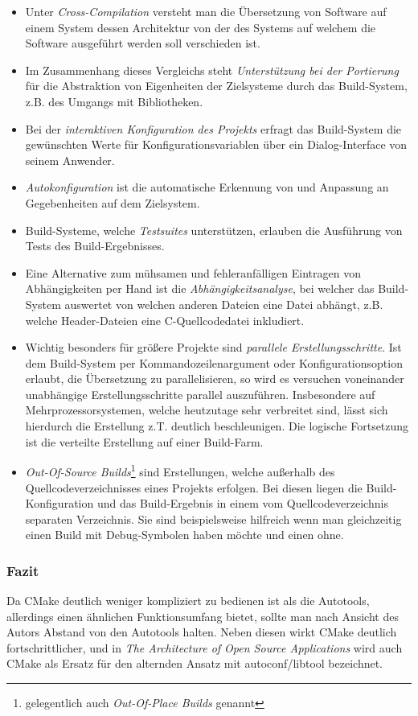 \begin{itemize}
%
\item Unter \emph{Cross-Compilation} versteht man die Übersetzung von Software
auf einem System dessen Architektur von der des Systems auf welchem die Software
ausgeführt werden soll verschieden ist.
%
\item Im Zusammenhang dieses Vergleichs steht \emph{Unterstützung bei der
Portierung} für die Abstraktion von Eigenheiten der Zielsysteme durch das
Build-System, z.B. des Umgangs mit Bibliotheken.
%
\item Bei der \emph{interaktiven Konfiguration des Projekts} erfragt das
Build-System die gewünschten Werte für Konfigurationsvariablen über ein
Dialog-Interface von seinem Anwender.
%
\item \emph{Autokonfiguration} ist die automatische Erkennung von und Anpassung
an Gegebenheiten auf dem Zielsystem.
%
\item Build-Systeme, welche \emph{Testsuites} unterstützen, erlauben die
Ausführung von Tests des Build-Ergebnisses.
%
%
\item Eine Alternative zum mühsamen und fehleranfälligen Eintragen von
Abhängigkeiten per Hand ist die \emph{Abhängigkeitsanalyse}, bei welcher das
Build-System auswertet von welchen anderen Dateien eine Datei abhängt, z.B.
welche Header-Dateien eine C-Quellcodedatei inkludiert.
%
\item Wichtig besonders für größere Projekte sind \emph{parallele
Erstellungsschritte}. Ist dem Build-System per Kommandozeilenargument oder
Konfigurationsoption erlaubt, die Übersetzung zu parallelisieren, so wird es
versuchen voneinander unabhängige Erstellungsschritte parallel auszuführen.
Insbesondere auf Mehrprozessorsystemen, welche heutzutage sehr verbreitet sind,
lässt sich hierdurch die Erstellung z.T. deutlich beschleunigen. Die logische
Fortsetzung ist die verteilte Erstellung auf einer Build-Farm.
%
\item \emph{Out-Of-Source Builds}\footnote{gelegentlich auch \emph{Out-Of-Place
Builds} genannt} sind Erstellungen, welche außerhalb des Quellcodeverzeichnisses
eines Projekts erfolgen. Bei diesen liegen die Build-Konfiguration und das
Build-Ergebnis in einem vom Quellcodeverzeichnis separaten Verzeichnis. Sie sind
beispielsweise hilfreich wenn man gleichzeitig einen Build mit Debug-Symbolen
haben möchte und einen ohne.
%
\end{itemize}

\subsubsection*{Fazit}
%
Da CMake deutlich weniger kompliziert zu bedienen ist als die Autotools,
allerdings einen ähnlichen Funktionsumfang bietet, sollte man nach Ansicht des
Autors Abstand von den Autotools halten. Neben diesen wirkt CMake deutlich
fortschrittlicher, und in \textit{The Architecture of Open Source Applications}
 wird auch CMake als Ersatz für den alternden Ansatz mit
autoconf/libtool bezeichnet.

